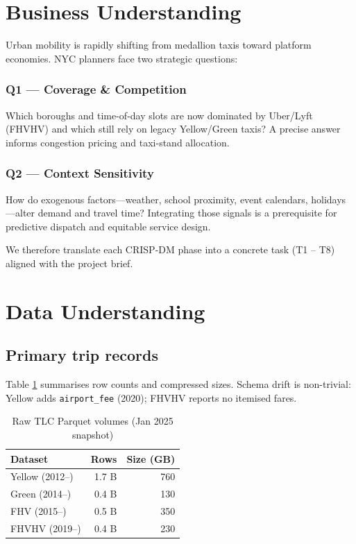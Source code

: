 \documentclass[conference]{IEEEtran}
\begin{document}
\section{Business Understanding}
Urban mobility is rapidly shifting from medallion taxis toward platform
economies.  NYC planners face two strategic questions:

\subsubsection*{Q1 — Coverage \& Competition}
Which boroughs and time-of-day slots are now dominated by Uber/Lyft
(FHVHV) and which still rely on legacy Yellow/Green taxis?  A precise
answer informs congestion pricing and taxi-stand allocation.

\subsubsection*{Q2 — Context Sensitivity}
How do exogenous factors—weather, school proximity, event calendars,
holidays—alter demand and travel time?  Integrating those signals is a
prerequisite for predictive dispatch and equitable service design.

We therefore translate each CRISP-DM phase into a concrete task
(T1 – T8) aligned with the project brief.

\section{Data Understanding}
\subsection{Primary trip records}
Table \ref{tab:raw-volumes} summarises row counts and compressed sizes.
Schema drift is non-trivial: Yellow adds
\texttt{airport\_fee} (2020); FHVHV reports no itemised fares.

\begin{table}[htbp]
\caption{Raw TLC Parquet volumes (Jan 2025 snapshot)}
\label{tab:raw-volumes}
\centering
\begin{tabular}{lrr}
\toprule
Dataset & Rows & Size (GB) \\ \midrule
Yellow (2012–) & 1.7 B & 760\\
Green (2014–)  & 0.4 B & 130\\
FHV (2015–)    & 0.5 B & 350\\
FHVHV (2019–)  & 0.4 B & 230\\
\bottomrule
\end{tabular}
\end{table}
\end{document}
